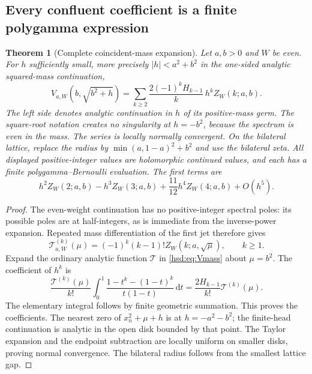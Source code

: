 \documentclass[11pt]{article}
\numberwithin{equation}{section}
\newtheorem{theorem}{Theorem}[section]
\theoremstyle{definition}\newtheorem{definition}[theorem]{Definition}
\theoremstyle{remark}\newtheorem{remark}[theorem]{Remark}
\newcommand{\dd}{\,\mathrm d}
\begin{document}
\subsection{Every confluent coefficient is a finite polygamma expression}
\begin{theorem}[Complete coincident-mass expansion]\label{hsd:thm:collision}
Let $a,b>0$ and $W$ be even. For $h$ sufficiently small, more precisely
$|h|<a^2+b^2$ in the one-sided analytic squared-mass continuation,
\begin{equation}\label{hsd:eq:Vcollision}
 \boxed{\displaystyle
 V_{a,W}(b,\sqrt{b^2+h})=
 \sum_{k\ge2}\frac{2(-1)^kH_{k-1}}k\,h^k Z_W(k;a,b).}
\end{equation}
The left side denotes analytic continuation in $h$ of its positive-mass
germ. The square-root notation creates no singularity at $h=-b^2$,
because the spectrum is even in the mass. The series is locally normally
convergent. On the bilateral lattice, replace the radius by $\min(a,1-a)^2+b^2$ and use the bilateral zeta.
All displayed positive-integer values are holomorphic continued values,
and each has a finite polygamma--Bernoulli evaluation. The first terms are
\begin{equation}\label{hsd:eq:Vfirstterms}
 h^2Z_W(2;a,b)-h^3Z_W(3;a,b)+\frac{11}{12}h^4Z_W(4;a,b)+O(h^5).
\end{equation}
\end{theorem}
\begin{proof}
The even-weight continuation has no positive-integer spectral poles:
its possible poles are at half-integers, as is immediate from the
inverse-power expansion. Repeated mass differentiation of the first
jet therefore gives
\begin{equation}\label{hsd:eq:Tderivs}
 \mathcal T_{a,W}^{(k)}(\mu)=(-1)^k(k-1)!Z_W(k;a,\sqrt\mu),
 \qquad k\ge1.
\end{equation}
Expand the ordinary analytic function $\mathcal T$ in
\eqref{hsd:eq:Vmass} about $\mu=b^2$. The coefficient of $h^k$ is
\[
 \frac{\mathcal T^{(k)}(\mu)}{k!}
 \int_0^1\frac{1-t^k-(1-t)^k}{t(1-t)}\dd t
       =\frac{2H_{k-1}}{k!}\mathcal T^{(k)}(\mu).
\]
The elementary integral follows by finite geometric summation. This
proves the coefficients. The nearest zero of $x_n^2+\mu+h$ is at
$h=-a^2-b^2$; the finite-head continuation is analytic in the open disk
bounded by that point. The Taylor expansion and the endpoint subtraction
are locally uniform on smaller disks, proving normal convergence.
The bilateral radius follows from the smallest lattice gap.
\end{proof}
\end{document}
